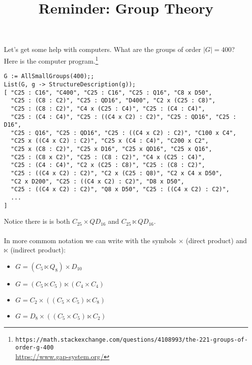 \documentclass[12pt]{article}
\title{Reminder: Group Theory}
\date{}
\begin{document}
\sffamily

\maketitle

{\fontsize{16pt}{16pt}\selectfont 

\noindent Let's get some help with computers.  What are the groups of order $|G| = 400$?  Here is the computer program.\footnote{\texttt{https://math.stackexchange.com/questions/4108993/the-221-groups-of-order-g-400} \\
\url{https://www.gap-system.org/}}

\begin{verbatim}
G := AllSmallGroups(400);;
List(G, g -> StructureDescription(g));
[ "C25 : C16", "C400", "C25 : C16", "C25 : Q16", "C8 x D50",
  "C25 : (C8 : C2)", "C25 : QD16", "D400", "C2 x (C25 : C8)",
  "C25 : (C8 : C2)", "C4 x (C25 : C4)", "C25 : (C4 : C4)",
  "C25 : (C4 : C4)", "C25 : ((C4 x C2) : C2)", "C25 : QD16", "C25 : D16",
  "C25 : Q16", "C25 : QD16", "C25 : ((C4 x C2) : C2)", "C100 x C4",
  "C25 x ((C4 x C2) : C2)", "C25 x (C4 : C4)", "C200 x C2",
  "C25 x (C8 : C2)", "C25 x D16", "C25 x QD16", "C25 x Q16",
  "C25 : (C8 x C2)", "C25 : (C8 : C2)", "C4 x (C25 : C4)",
  "C25 : (C4 : C4)", "C2 x (C25 : C8)", "C25 : (C8 : C2)",
  "C25 : ((C4 x C2) : C2)", "C2 x (C25 : Q8)", "C2 x C4 x D50",
  "C2 x D200", "C25 : ((C4 x C2) : C2)", "D8 x D50",
  "C25 : ((C4 x C2) : C2)", "Q8 x D50", "C25 : ((C4 x C2) : C2)",
  ...
]
\end{verbatim}
Notice there is is both $C_{25} \times QD_{16}$ and $C_{25}\ltimes QD_{16}$. \\ \\
In more commom notation we can write with the symbols $\times$ (direct product) and $\ltimes$ (indirect product):
\begin{itemize}
\item $G = (C_5 \ltimes Q_8 ) \times D_{10}$
\item $G = (C_5 \ltimes C_5) \ltimes (C_4 \times C_4) $
\item $G = C_2 \times ((C_5 \times C_5) \ltimes C_8)$
\item $G = D_8 \times ((C_5 \times C_5) \ltimes C_2)$
\end{itemize}

\newpage

}
\end{document}
